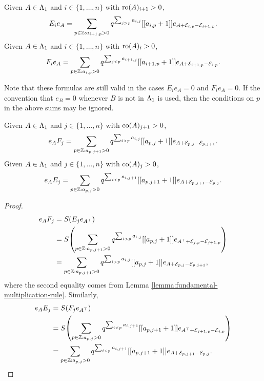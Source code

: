 \documentclass[a4paper, 11pt]{report}
\begin{document}
\begin{lemma}\label{lemma:fundamental-multiplication-rule}
Given $A\in\Lambda_1{}$ and $i\in\{1,\ldots,n\}$ with $\operatorname{ro}(A)_{i+1}>0$,
\begin{equation*}
E_ie_A = \sum_{p\in\mathbb{Z}:a_{i+1,p}>0} q^{\sum_{j>p}a_{i,j}} [[a_{i,p}+1]] e_{A+\mathcal{E}_{i,p} -\mathcal{E}_{i+1,p}}.
\end{equation*}
Given $A\in\Lambda_1{}$ and $i\in\{1,\ldots,n\}$ with $\operatorname{ro}(A)_i>0$,
\begin{equation*}
F_ie_A = \sum_{p\in\mathbb{Z}:a_{i,p}>0} q^{\sum_{j<p}a_{i+1,j}} [[a_{i+1,p}+1]] e_{A+\mathcal{E}_{i+1,p} -\mathcal{E}_{i,p}}.
\end{equation*}
\end{lemma}

Note that these formulas are still valid in the cases $E_ie_A=0$ and $F_ie_A=0$. If the convention that $e_B = 0$ whenever $B$ is not in $\Lambda_1{}$ is used, then the conditions on $p$ in the above sums may be ignored.

\begin{corollary}\label{corollary:fundamental-right-multiplication-rules}
Given $A\in\Lambda_1{}$ and $j\in\{1,\ldots,n\}$ with $\operatorname{co}(A)_{j+1}>0$,
\begin{equation*}
e_AF_j = \sum_{p\in\mathbb{Z}: a_{p,j+1}>0} q^{\sum_{i>p}a_{i,j}} [[a_{p,j}+1]] e_{A+\mathcal{E}_{p,j}-\mathcal{E}_{p,j+1}}.
\end{equation*}
Given $A\in\Lambda_1{}$ and $j\in\{1,\ldots,n\}$ with $\operatorname{co}(A)_{j}>0$,
\begin{equation*}
e_AE_j = \sum_{p\in\mathbb{Z}: a_{p,j}>0} q^{\sum_{i<p} a_{i,j+1}} [[a_{p,j+1}+1]] e_{A+\mathcal{E}_{p,j+1}-\mathcal{E}_{p,j}}.
\end{equation*}
\end{corollary}

\begin{proof}
\begin{align*}
e_AF_j
&= S{\left(E_j e_{A^\top}\right)}\\
&= S{\left(\sum_{p\in\mathbb{Z}: a_{p,j+1}>0} q^{\sum_{i>p} a_{i,j}} [[a_{p,j}+1]] e_{A^\top +\mathcal{E}_{j,p} -\mathcal{E}_{j+1,p}}\right)}\\
&= \sum_{p\in\mathbb{Z}: a_{p,j+1}>0} q^{\sum_{i>p}a_{i,j}} [[a_{p,j}+1]] e_{A+\mathcal{E}_{p,j}-\mathcal{E}_{p,j+1}},
\end{align*}
where the second equality comes from Lemma \ref{lemma:fundamental-multiplication-rule}. Similarly,
\begin{align*}
e_AE_j
&= S{\left(F_j e_{A^\top}\right)}\\
&= S{\left( \sum_{p\in\mathbb{Z}:a_{p,j}>0} q^{\sum_{i<p} a_{i,j+1}} [[a_{p,j+1}+1]] e_{A^\top +\mathcal{E}_{j+1,p} - \mathcal{E}_{j,p}}\right)}\\
&= \sum_{p\in\mathbb{Z}: a_{p,j}>0} q^{\sum_{i<p}a_{i,j+1}} [[a_{p,j+1}+1]] e_{A+\mathcal{E}_{p,j+1} -\mathcal{E}_{p,j}}.
\end{align*}
\end{proof}
\end{document}
